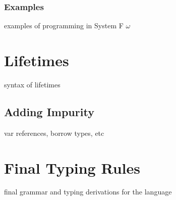 \subsubsection{Examples}
examples of programming in System F $\omega$

\section{Lifetimes}
syntax of lifetimes

\subsection{Adding Impurity}
var references, borrow types, etc

\section{Final Typing Rules}
final grammar and typing derivations for the language

